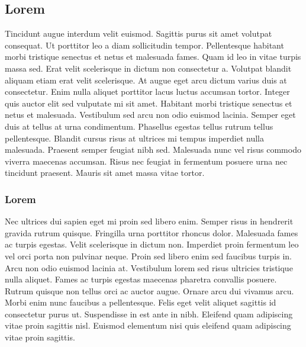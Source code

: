 \subsection{Lorem}
Tincidunt augue interdum velit euismod. Sagittis purus sit amet volutpat consequat. Ut porttitor leo a diam sollicitudin tempor. Pellentesque habitant morbi tristique senectus et netus et malesuada fames. Quam id leo in vitae turpis massa sed. Erat velit scelerisque in dictum non consectetur a. Volutpat blandit aliquam etiam erat velit scelerisque. At augue eget arcu dictum varius duis at consectetur. Enim nulla aliquet porttitor lacus luctus accumsan tortor. Integer quis auctor elit sed vulputate mi sit amet. Habitant morbi tristique senectus et netus et malesuada. Vestibulum sed arcu non odio euismod lacinia. Semper eget duis at tellus at urna condimentum. Phasellus egestas tellus rutrum tellus pellentesque. Blandit cursus risus at ultrices mi tempus imperdiet nulla malesuada. Praesent semper feugiat nibh sed. Malesuada nunc vel risus commodo viverra maecenas accumsan. Risus nec feugiat in fermentum posuere urna nec tincidunt praesent. Mauris sit amet massa vitae tortor.
\subsubsection{Lorem}
Nec ultrices dui sapien eget mi proin sed libero enim. Semper risus in hendrerit gravida rutrum quisque. Fringilla urna porttitor rhoncus dolor. Malesuada fames ac turpis egestas. Velit scelerisque in dictum non. Imperdiet proin fermentum leo vel orci porta non pulvinar neque. Proin sed libero enim sed faucibus turpis in. Arcu non odio euismod lacinia at. Vestibulum lorem sed risus ultricies tristique nulla aliquet. Fames ac turpis egestas maecenas pharetra convallis posuere. Rutrum quisque non tellus orci ac auctor augue. Ornare arcu dui vivamus arcu. Morbi enim nunc faucibus a pellentesque. Felis eget velit aliquet sagittis id consectetur purus ut. Suspendisse in est ante in nibh. Eleifend quam adipiscing vitae proin sagittis nisl. Euismod elementum nisi quis eleifend quam adipiscing vitae proin sagittis.
\newpage
